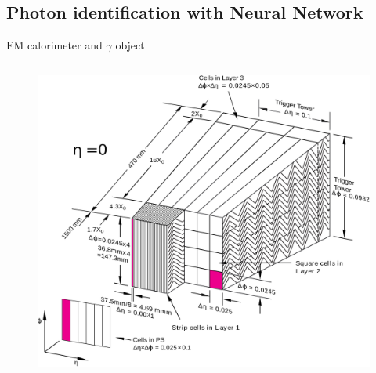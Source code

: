 \subsection{Photon identification with Neural Network}
\begin{frame}{EM calorimeter and $\gamma$ object}
\begin{columns}
\begin{figure}
    \centering
    \includegraphics[width=1.\textwidth]{Part6/Img/EM.png}
\end{figure}


\end{columns}
\end{frame}
